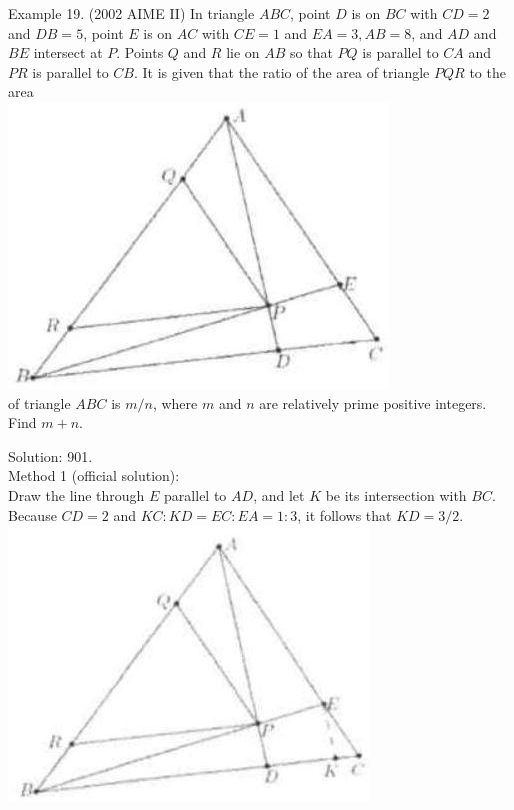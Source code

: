 \documentclass[10pt]{article}
\begin{document}
Example 19. (2002 AIME II) In triangle \(A B C\), point \(D\) is on \(B C\) with \(C D=2\) and \(D B=5\), point \(E\) is on \(A C\) with \(C E=1\) and \(E A=3, A B=8\), and \(A D\) and \(B E\) intersect at \(P\). Points \(Q\) and \(R\) lie on \(A B\) so that \(P Q\) is parallel to \(C A\) and \(P R\) is parallel to \(C B\). It is given that the ratio of the area of triangle \(P Q R\) to the area\\
\includegraphics[max width=\textwidth, center]{2025_04_17_97bc1f7e44d93c271a88g-121(2)}\\
of triangle \(A B C\) is \(m / n\), where \(m\) and \(n\) are relatively prime positive integers. Find \(m+n\).

Solution: 901.\\
Method 1 (official solution):\\
Draw the line through \(E\) parallel to \(A D\), and let \(K\) be its intersection with \(B C\).\\
Because \(C D=2\) and \(K C: K D=E C: E A=1: 3\), it follows that \(K D=3 / 2\).\\
\includegraphics[max width=\textwidth, center]{2025_04_17_97bc1f7e44d93c271a88g-122}
\end{document}

